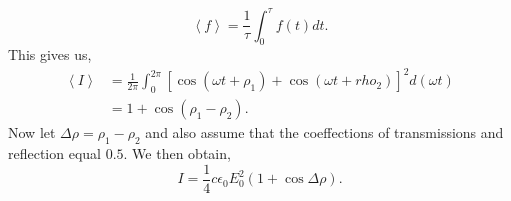 \documentclass[working, oneside]{inputs/tuftebook}
\begin{document}
\[
\left<f \right> = \frac{1}{\tau} \int_{0}^{\tau}f\left( t \right) dt  
.\]
This gives us,
\begin{align*}
\left<I \right> &=  \frac{1}{2\pi} \int_{0}^{2\pi} \left[ \cos\left( \omega t + \rho_1 \right) + \cos\left( \omega t + rho_2 \right)   \right] ^2 d \left( \omega t \right)  \\
&=  1+ \cos\left( \rho _1 - \rho_2  \right)  
.\end{align*}
Now let $ \Delta \rho = \rho_1 - \rho_2$ and also assume that the coeffections of transmissions and reflection equal $0.5$. We then obtain,
 \[
I = \frac{1}{4}c\epsilon_0 E_0^2 \left( 1 + \cos \Delta \rho  \right) 
.\] 
\end{document}
